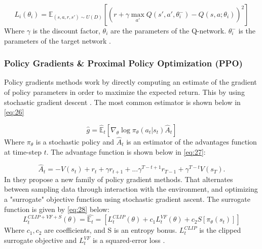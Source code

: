 \documentclass{kththesis}
\theoremstyle{definition}
\begin{document}
\begin{equation}
    \label{eq:25}
    L_i(\theta_i) = \mathbb{E}_{(s,a,r,s') \sim U(D)} \left[\left(r+ \gamma \underset{a'}{\operatorname{max}}Q(s', a', \theta_{i}^{-})-Q(s,a;\theta_i)  \right)^2 \right]
\end{equation}
Where $\gamma$ is the discount factor, $\theta_i$ are the parameters of the Q-network. $\theta_{i}^{-}$ is the parameters of the target network \parencite{mnih2015human}.


\subsubsection*{Policy Gradients \& Proximal Policy Optimization (PPO)}
Policy gradients methods work by directly computing an estimate of the gradient of policy parameters in order to maximize the expected return. This by using stochastic gradient descent \parencite{bansal2017emergent, schulman2017proximal}. The most common estimator is shown below in \autoref{eq:26}

\begin{equation}
    \label{eq:26}
    \hat{g} = \hat{\mathbb{E}}_{t}\left[\nabla_{\theta} \log{\pi_{\theta}(a_t|s_t)\hat{A}_{t}} \right]
\end{equation}
Where $\pi_{\theta}$ is a stochastic policy and $\hat{A}_{t}$ is an estimator of the advantages function at time-step $t$. The advantage function is shown below in \autoref{eq:27}:

\begin{equation}
    \label{eq:27}
    \hat{A}_{t} = -V(s_t) + r_t +\gamma r_{t+1} + ... \gamma^{T-t+1} r_{T-1} + \gamma^{T-t}V(s_T).
\end{equation}
In \textcite{schulman2017proximal} they propose a new family of policy gradient methods. That alternates between sampling data through interaction with the environment, and optimizing a "surrogate" objective function using stochastic gradient ascent.  The surrogate function is given by \autoref{eq:28} below: 
\begin{equation}
    \label{eq:28}
    L_{t}^{CLIP + VF+ S}(\theta) = \hat{\mathbb{E}_{t}} = \left[L_{t}^{CLIP}(\theta) + c_1 L_{t}^{VF}(\theta) + c_2S[\pi_{\theta}(s_t)]\right]
\end{equation}
Where $c_1,c_2$ are coefficients, and S is an entropy bonus. $L_{t}^{CLIP}$ is the clipped surrogate objective and $L_{t}^{VF}$ is a squared-error loss \parencite{schulman2017proximal}.
\end{document}
